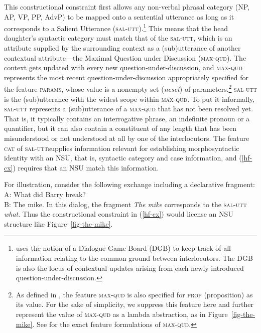 \zs
%
%
This constructional constraint first allows 
any non-verbal phrasal category (NP, AP, VP, PP, AdvP) to be mapped onto a sentential utterance as long as it corresponds to a Salient Utterance (\textsc{sal-utt}).\footnote{\citet{Ginzburg2012} uses the notion of a Dialogue Game Board (DGB) to keep track of all information relating to the common ground between interlocutors. The DGB is also the locus of contextual updates arising from each newly introduced question-under-discussion.}
 This means that
the head daughter's syntactic category must match that of the \textsc{sal-utt}, which is an attribute supplied by the surrounding context as a (sub)utterance of another contextual attribute---the Maximal Question under Discussion (\textsc{max-qud}). The context gets updated with every new question-under-discussion, and \textsc{max-qud} represents the most recent question-under-discussion appropriately specified for the feature \textsc{params}, whose value is a nonempty set (\textit{neset}) of parameters.\footnote{As defined in \citet[304]{Ginzburg:Sag:2000}, the feature \textsc{max-qud} is also specified for \textsc{prop} (proposition) as its value. For the sake of simplicity, we suppress this feature here and further 
represent the value of
\textsc{max-qud} as a lambda abstraction, as in Figure~\ref{fig-the-mike}. 
See \citet[304]{Ginzburg:Sag:2000} for the
exact feature formulations of \textsc{max-qud}.} \textsc{sal-utt} is the (sub)utterance with the widest scope within \textsc{max-qud}. To put it informally, \textsc{sal-utt} represents a (sub)utterance of a \textsc{max-qud} that has not been resolved yet. That is, it typically contains an interrogative phrase, an indefinite pronoun or a quantifier, but it can also contain a constituent of any length that has been misunderstood or not understood at all by one of the interlocutors. The feature \textsc{cat} of \textsc{sal-utt}supplies information relevant for establishing morphosyntactic identity with an NSU, that is, syntactic category and case information, and (\ref{hf-cx}) requires that an NSU  match this information. 

For illustration, consider the following exchange including 
a declarative fragment:
%
\ea
A: What did Barry break? \\
B: The mike.\label{37}
\z
%
In this dialog, the fragment \emph{The mike} 
corresponds to the \textsc{sal-utt} \emph{what}. Thus  
  the constructional constraint in (\ref{hf-cx}) would license an NSU structure
  like Figure~\ref{fig-the-mike}.
  
